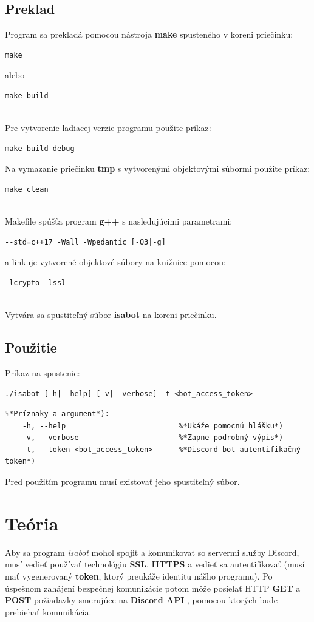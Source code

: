 \documentclass[a4paper,12pt]{article}
\begin{document}
\subsection{Preklad}
Program sa prekladá pomocou nástroja {\bf make} spusteného v koreni priečinku:
\begin{lstlisting}
make
\end{lstlisting}
alebo
\begin{lstlisting}
make build
\end{lstlisting}
\leavevmode\\
Pre vytvorenie ladiacej verzie programu použite príkaz:
\begin{lstlisting}
make build-debug
\end{lstlisting}
Na vymazanie priečinku \textbf{tmp} s vytvorenými objektovými súbormi použite príkaz:
\begin{lstlisting}
make clean
\end{lstlisting}
\leavevmode\\
Makefile spúšťa program \textbf{g++} s nasledujúcimi parametrami:
\begin{lstlisting}
--std=c++17 -Wall -Wpedantic [-O3|-g]
\end{lstlisting}
a linkuje vytvorené objektové súbory na knižnice pomocou:
\begin{lstlisting}
-lcrypto -lssl
\end{lstlisting}
\leavevmode\\
Vytvára sa spustiteľný súbor {\bf isabot} na koreni priečinku.

\subsection{Použitie}
Príkaz na spustenie:
\begin{lstlisting}
./isabot [-h|--help] [-v|--verbose] -t <bot_access_token>
\end{lstlisting}
\begin{lstlisting}
%*Príznaky a argument*):
    -h, --help                          %*Ukáže pomocnú hlášku*)
    -v, --verbose                       %*Zapne podrobný výpis*)
    -t, --token <bot_access_token>      %*Discord bot autentifikačný token*)
\end{lstlisting}
Pred použitím programu musí existovať jeho spustiteľný súbor.

\newpage
\section{Teória}
Aby sa program \textit{isabot} mohol spojiť a komunikovať so servermi služby Discord, musí vedieť používať technológiu \textbf{SSL}, \textbf{HTTPS} a vedieť sa autentifikovať (musí mať vygenerovaný \textbf{token}, ktorý preukáže identitu nášho programu). Po úspešnom zahájení bezpečnej komunikácie potom môže posielať HTTP \textbf{GET} a \textbf{POST} požiadavky smerujúce na \textbf{Discord API} \cite{discord}, pomocou ktorých bude prebiehať komunikácia.
\end{document}
